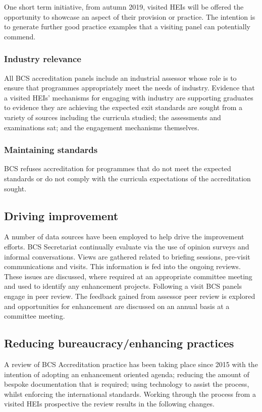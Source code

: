 \documentclass[sigconf]{acmart}
\begin{document}
One short term initiative, from autumn 2019, visited HEIs will be offered the opportunity to showcase an aspect of their provision or practice. The intention is to generate further good practice examples that a visiting panel can potentially commend.

\subsubsection{Industry relevance}
All BCS accreditation panels include an industrial assessor whose role is to ensure that programmes appropriately meet the needs of industry. Evidence that a visited HEIs' mechanisms for engaging with industry are supporting graduates to evidence they are achieving the expected exit standards are sought from a variety of sources including the curricula studied; the assessments and examinations sat; and the engagement mechanisms themselves.

\subsubsection{Maintaining standards}
BCS refuses accreditation for programmes that do not meet the expected standards or do not comply with the curricula expectations of the accreditation sought.

\subsection{Driving improvement}
A number of data sources have been employed to help drive the improvement efforts. BCS Secretariat continually evaluate via the use of opinion surveys and informal conversations. Views are gathered related to briefing sessions, pre-visit communications and visits. This information is fed into the ongoing reviews. These issues are discussed, where required at an appropriate committee meeting and used to identify any enhancement projects. Following a visit BCS panels engage in peer review. The feedback gained from assessor peer review is explored and opportunities for enhancement are discussed on an annual basis at a committee meeting. 

\subsection{Reducing bureaucracy/enhancing practices}
A review of BCS Accreditation practice has been taking place since 2015 with the intention of adopting an enhancement oriented agenda; reducing the amount of bespoke documentation that is required; using technology to assist the process, whilst enforcing the international standards.
%
Working through the process from a visited HEIs prospective the review results in the following changes.
\end{document}
